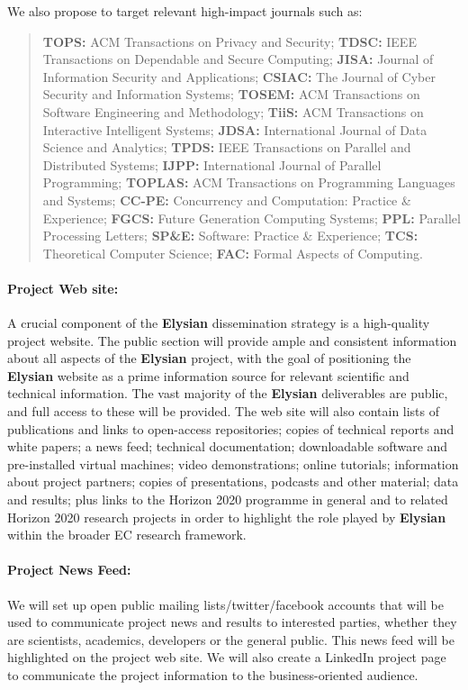 \documentclass[a4paper,11pt]{article}
\newcommand{\project}[1]{\textbf{#1}\xspace}
\newcommand{\SECURITY}{\project{Elysian}}
\newcommand{\TheProject}{\SECURITY}
\begin{document}
\noindent
We also propose to target relevant high-impact journals such as:
\begin{quote}
\textbf{TOPS:} ACM Transactions on Privacy and Security;
\textbf{TDSC:} IEEE Transactions on Dependable and Secure Computing;
\textbf{JISA:} Journal of Information Security and Applications;
\textbf{CSIAC:} The Journal of Cyber Security and Information Systems;
\textbf{TOSEM:} ACM Transactions on Software Engineering and Methodology;
\textbf{TiiS:} ACM Transactions on Interactive Intelligent Systems;
\textbf{JDSA:} International Journal of Data Science and Analytics;
\textbf{TPDS:} IEEE Transactions on Parallel and Distributed Systems;
\textbf{IJPP:} International Journal of Parallel Programming;
\textbf{TOPLAS: } ACM Transactions on Programming Languages and Systems;
\textbf{CC-PE: } Concurrency and Computation: Practice \& Experience;
\textbf{FGCS: } Future Generation Computing Systems;
\textbf{PPL: } Parallel Processing Letters; 
\textbf{SP\&E: } Software: Practice \& Experience; 
\textbf{TCS:} Theoretical Computer Science;
\textbf{FAC:} Formal Aspects of Computing.
\end{quote}

\paragraph{Project Web site:}  
A crucial component of the \TheProject{} dissemination strategy is a
high-quality project website. The public section will provide ample
and consistent information about all aspects of the \TheProject{}
project, with the goal of positioning the \TheProject{} website as a
prime information source for relevant scientific and technical
information.  The vast majority of the \TheProject{} deliverables are
public, and full access to these will be provided.  The web site will also contain lists of publications and links
to open-access repositories; copies of technical reports and white
papers; a news feed; technical documentation; downloadable software
and pre-installed virtual machines; video demonstrations; online
tutorials; information about project partners; copies of
presentations, podcasts and other material; data and results; plus
links to the Horizon 2020 programme in general and to related 
Horizon 2020 research projects in order to highlight the role played by \TheProject{} within the
broader EC research framework.

\paragraph{Project News Feed:}  We will set up open public mailing lists/twitter/facebook accounts that will
be used to communicate project news and results to interested parties, whether they are scientists, academics, developers
or the general public.  This news feed will be highlighted on the project web site. We will also create a LinkedIn project page to 
communicate the project information to the business-oriented audience.
\end{document}
